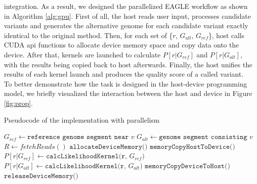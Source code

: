 \documentclass{PHlab-thesis}
\begin{document}
integration. As a result, we designed the parallelized EAGLE workflow as shown in Algorithm \ref{alg:gpu}. First of all, the host reads user input, processes candidate variants and generates the alternative genome for each candidate variant exactly identical to the original method. Then, for each set of \{$r$, $G_{alt}$, $G_{ref}$\}, host calls CUDA api functions to allocate device memory space and copy data onto the device. After that, kernels are launched to calculate $P[r|G_{ref}]$ and $P[r|G_{alt}]$, with the results being copied back to host afterwards. Finally, the host unifies the results of each kernel launch and produces the quality score of a called variant. To better demonstrate how the task is designed in the host-device programming model, we briefly visualized the interaction between the host and device in Figure \ref{fig:prop}. 
\begin{algorithm}
	\caption{Pseudocode of the implementation with parallelism}
	\label{alg:gpu}
	\begin{algorithmic}
		\State $G_{ref} \gets \texttt{reference genome segment near } v$
		\State $G_{alt} \gets \texttt{genome segment consisting } v$
		\State $R \gets fetchReads()$ 
			\State $\texttt{allocateDeviceMemory()}$
			\State $\texttt{memoryCopyHostToDevice()}$
			\State $P[r|G_{ref}] \gets \texttt{calcLikelihoodKernel(r, $G_{ref}$)}$
			\State $P[r|G_{alt}] \gets \texttt{calcLikelihoodKernel(r, $G_{alt}$)}$
			\State $\texttt{memoryCopyDeviceToHost()}$
			\State $\texttt{releaseDeviceMemory()}$
		\EndFor
	\EndFor
	\end{algorithmic}
\end{algorithm}
\end{document}
